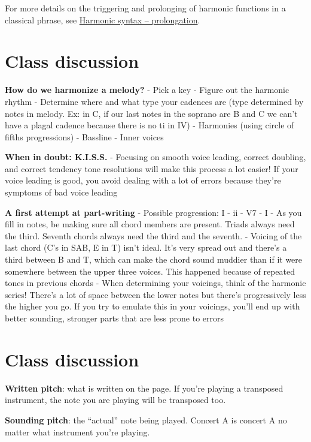 \documentclass{book}
\begin{document}
For more details on the triggering and prolonging of harmonic functions in a
classical phrase, see \href{harmonicSyntax2}{Harmonic syntax -- prolongation}.

\hypertarget{class-discussion-3}{%
\chapter{Class discussion}\label{class-discussion-3}}

\textbf{How do we harmonize a melody?} - Pick a key - Figure out the harmonic
rhythm - Determine where and what type your cadences are (type determined by
notes in melody. Ex: in C, if our last notes in the soprano are B and C we
can't have a plagal cadence because there is no ti in IV) - Harmonies (using
circle of fifths progressions) - Bassline - Inner voices

\textbf{When in doubt: K.I.S.S.} - Focusing on smooth voice leading, correct
doubling, and correct tendency tone resolutions will make this process a lot
easier! If your voice leading is good, you avoid dealing with a lot of errors
because they're symptoms of bad voice leading

\textbf{A first attempt at part-writing} - Possible progression: I - ii - V7 -
I - As you fill in notes, be making sure all chord members are present. Triads
always need the third. Seventh chords always need the third and the seventh. -
Voicing of the last chord (C's in SAB, E in T) isn't ideal. It's very spread
out and there's a third between B and T, which can make the chord sound
muddier than if it were somewhere between the upper three voices. This
happened because of repeated tones in previous chords - When determining your
voicings, think of the harmonic series! There's a lot of space between the
lower notes but there's progressively less the higher you go. If you try to
emulate this in your voicings, you'll end up with better sounding, stronger
parts that are less prone to errors

\hypertarget{class-discussion-4}{%
\chapter{Class discussion}\label{class-discussion-4}}

\textbf{Written pitch}: what is written on the page. If you're playing a
transposed instrument, the note you are playing will be transposed too.

\textbf{Sounding pitch}: the ``actual'' note being played. Concert A is
concert A no matter what instrument you're playing.
\end{document}
